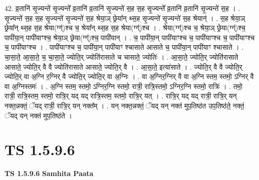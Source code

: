 \documentclass[17pt]{extarticle}
\begin{document}
42. व्र॒तानि॑ सृ॒ज्यन्ते॑ सृ॒ज्यन्ते᳚ व्र॒तानि॑ व्र॒तानि॑ सृ॒ज्यन्ते॑ स॒ह स॒ह सृ॒ज्यन्ते᳚ व्र॒तानि॑ व्र॒तानि॑ सृ॒ज्यन्ते॑ स॒ह । . सृ॒ज्यन्ते॑ स॒ह स॒ह सृ॒ज्यन्ते॑ सृ॒ज्यन्ते॑ स॒ह श्रेया॒ञ् छ्रेया᳚न् थ्स॒ह सृ॒ज्यन्ते॑ सृ॒ज्यन्ते॑ स॒ह श्रेयान्॑ । . स॒ह श्रेया॒ञ् छ्रेया᳚न् थ्स॒ह स॒ह श्रेया(ग्ग्॑)श्च च॒ श्रेया᳚न् थ्स॒ह स॒ह श्रेया(ग्ग्॑)श्च । . श्रेया(ग्ग्॑)श्च च॒ श्रेया॒ञ् छ्रेया(ग्ग्॑)श्च॒ पापी॑या॒न् पापी॑याꣳश्च॒ श्रेया॒ञ् छ्रेया(ग्ग्॑)श्च॒ पापी॑यान् । . च॒ पापी॑या॒न् पापी॑याꣳश्च च॒ पापी॑याꣳश्च च॒ पापी॑याꣳश्च च॒ पापी॑याꣳश्च । . पापी॑याꣳश्च च॒ पापी॑या॒न् पापी॑याꣳ श्चासाते आसाते च॒ पापी॑या॒न् पापी॑याꣳ श्चासाते । . चा॒सा॒ते॒ आ॒सा॒ते॒ च॒ चा॒सा॒ते॒ ज्योति॒र् ज्योति॑रासाते च चासाते॒ ज्योतिः॑ । . आ॒सा॒ते॒ ज्योति॒र् ज्योति॑रासाते आसाते॒ ज्योति॒र् वै वै ज्योति॑रासाते आसाते॒ ज्योति॒र् वै । . आ॒सा॒ते॒ इत्या॑साते । . ज्योति॒र् वै वै ज्योति॒र् ज्योति॒र् वा अ॒ग्नि र॒ग्निर् वै ज्योति॒र् ज्योति॒र् वा अ॒ग्निः । . वा अ॒ग्निर॒ग्निर् वै वा अ॒ग्नि स्तम॒ स्तमो॒ ऽग्निर् वै वा अ॒ग्निस्तमः॑ । . अ॒ग्नि स्तम॒ स्तमो॒ ऽग्निर॒ग्नि स्तमो॒ रात्री॒ रात्रि॒स्तमो॒ ऽग्निर॒ग्नि स्तमो॒ रात्रिः॑ । . तमो॒ रात्री॒ रात्रि॒स्तम॒ स्तमो॒ रात्रि॒र् यद् यद् रात्रि॒स्तम॒ स्तमो॒ रात्रि॒र् यत् । . रात्रि॒र् यद् यद् रात्री॒ रात्रि॒र् यन् नक्त॒न्नक्तं॒ ॅयद् रात्री॒ रात्रि॒र् यन् नक्त᳚म् । . यन् नक्त॒न्नक्तं॒ ॅयद् यन् नक्त॑ मुप॒तिष्ठ॑त उप॒तिष्ठ॑ते॒ नक्तं॒ ॅयद् यन् नक्त॑ मुप॒तिष्ठ॑ते । \newline
\pagebreak
{}
\section*{ TS 1.5.9.6 }

\textbf{TS 1.5.9.6 } \newline
\textbf{Samhita Paata} \newline
\end{document}
